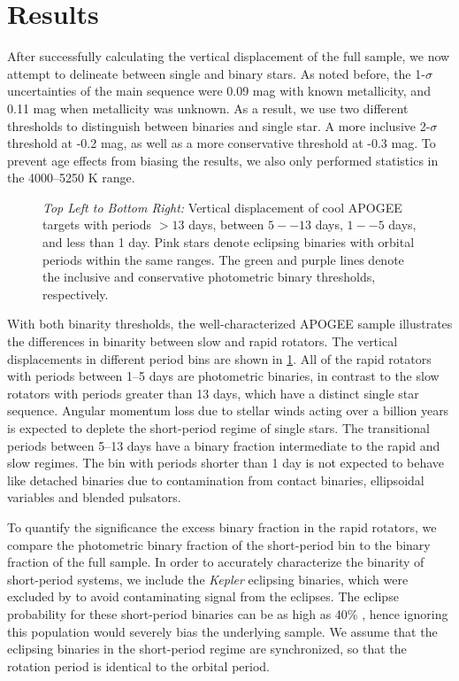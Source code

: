 \documentclass[manuscript]{aastex6}
\newcommand{\Kepler}{\mbox{\textit{Kepler}}}
\begin{document}
\section{Results}
\label{sec:results}


After successfully calculating the vertical displacement of the full sample, we
now attempt to delineate between single and binary stars. As noted before, the
1-\(\sigma\) uncertainties of the main sequence were 0.09 mag with known
metallicity, and 0.11 mag when metallicity was unknown. As a result, we use two
different thresholds to distinguish between binaries and single star. A more
inclusive 2-\(\sigma\) threshold at -0.2 mag, as well as a more
conservative threshold at -0.3 mag. To prevent age effects from 
biasing the results, we also only performed statistics in the 4000--5250 K 
range.

\begin{figure}[htb]
    \centering
    \caption{\emph{Top Left to Bottom Right:} Vertical displacement of cool 
        APOGEE targets with \citet{McQuillan14} periods \(> 13\) days, between 
        \(5--13\) days, \(1--5\) days, and less than 1 day. Pink stars denote 
        eclipsing binaries with orbital periods within the same ranges. The 
        green and purple lines denote the inclusive and conservative 
        photometric binary thresholds, 
    respectively.}\label{fig:apogee_rapid_excess}
\end{figure}

With both binarity thresholds, the well-characterized APOGEE sample 
illustrates the differences in binarity between slow and rapid rotators. The
vertical displacements in different period bins are shown in
\cref{fig:apogee_rapid_excess}. All of the rapid rotators with periods between
1--5 days are photometric binaries, in contrast to the slow rotators
with periods greater than 13 days, which have a distinct single star sequence. 
Angular momentum loss due to stellar winds acting over a billion years is
expected to deplete the short-period regime of single stars. The transitional 
periods between 5--13 days have a binary fraction intermediate to the 
rapid and slow regimes. The bin with periods shorter than 1 day is not expected
to behave like detached binaries due to contamination from contact binaries,
ellipsoidal variables and blended pulsators. 

To quantify the significance the excess binary fraction in the rapid rotators, 
we compare the photometric binary fraction of the short-period bin to the
binary fraction of the full sample. In order to accurately characterize the 
binarity of short-period systems, we include the \Kepler{} eclipsing binaries, 
which were excluded by \citet{McQuillan14} to avoid contaminating signal from the eclipses. The 
eclipse probability for these short-period binaries can be as high as 40\% 
\citep{Kirk16}, hence ignoring this population would severely
bias the underlying sample. We assume that the eclipsing binaries in the
short-period regime are synchronized, so that the rotation period is identical 
to the orbital period. 
\end{document}
